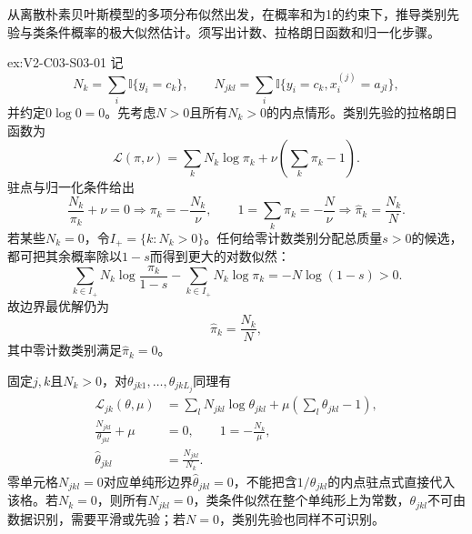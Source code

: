 \begin{SLChapterExercisePairSection}

\SLSourceBookExercises

\begin{exercise}\label{ex:V2-C03-S03-01}
从离散朴素贝叶斯模型的多项分布似然出发，在概率和为1的约束下，推导类别先验与类条件概率的极大似然估计。须写出计数、拉格朗日函数和归一化步骤。
\end{exercise}
\ifSLFullEdition
{}\label{sol:V2-C03-S03-01}
\begin{chapterexercisesolution}{ex:V2-C03-S03-01}
记
\[
N_k=\sum_i\mathbb I\{y_i=c_k\},
\qquad
N_{jkl}=\sum_i\mathbb I\{y_i=c_k,x_i^{(j)}=a_{jl}\},
\]
并约定$0\log0=0$。先考虑$N>0$且所有$N_k>0$的内点情形。类别先验的拉格朗日函数为
\[
\mathcal L(\pi,\nu)=\sum_kN_k\log\pi_k+\nu\left(\sum_k\pi_k-1\right).
\]
驻点与归一化条件给出
\[
\frac{N_k}{\pi_k}+\nu=0
\Longrightarrow
\pi_k=-\frac{N_k}{\nu},
\qquad
1=\sum_k\pi_k=-\frac{N}{\nu}
\Longrightarrow
\widehat\pi_k=\frac{N_k}{N}.
\]
若某些$N_k=0$，令$I_+=\{k:N_k>0\}$。任何给零计数类别分配总质量$s>0$的候选，都可把其余概率除以$1-s$而得到更大的对数似然：
\[
\sum_{k\in I_+}N_k\log\frac{\pi_k}{1-s}
-\sum_{k\in I_+}N_k\log\pi_k
=-N\log(1-s)>0.
\]
故边界最优解仍为
\[
\widehat\pi_k=\frac{N_k}{N},
\]
其中零计数类别满足$\widehat\pi_k=0$。

固定$j,k$且$N_k>0$，对$\theta_{jk1},\ldots,\theta_{jkL_j}$同理有
\[
\begin{aligned}
\mathcal L_{jk}(\theta,\mu)
&=\sum_lN_{jkl}\log\theta_{jkl}
 +\mu\left(\sum_l\theta_{jkl}-1\right),\\
\frac{N_{jkl}}{\theta_{jkl}}+\mu&=0,
\qquad
1=-\frac{N_k}{\mu},\\
\widehat\theta_{jkl}&=\frac{N_{jkl}}{N_k}.
\end{aligned}
\]
零单元格$N_{jkl}=0$对应单纯形边界$\widehat\theta_{jkl}=0$，不能把含$1/\theta_{jkl}$的内点驻点式直接代入该格。若$N_k=0$，则所有$N_{jkl}=0$，类条件似然在整个单纯形上为常数，$\theta_{jkl}$不可由数据识别，需要平滑或先验；若$N=0$，类别先验也同样不可识别。
\end{chapterexercisesolution}
\fi


\end{SLChapterExercisePairSection}
